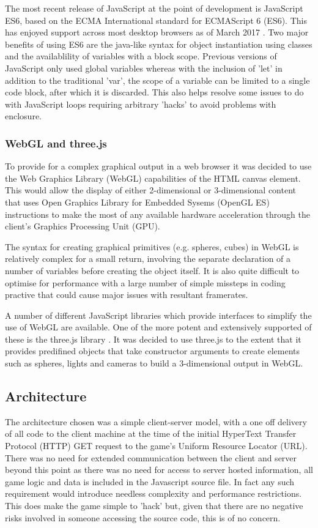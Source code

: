 \documentclass[twoside]{bhamthesis}
\begin{document}
The most recent release of JavaScript at the point of development is JavaScript ES6, based on the ECMA International standard for ECMAScript 6 (ES6). This has enjoyed support across most desktop browsers as of March 2017 \cite{zaytsev_ecmascript_2017}. Two major benefits of using ES6 are the java-like syntax for object instantiation using classes and the availablility of variables with a block scope. Previous versions of JavaScript only used global variables whereas with the inclusion of 'let' in addition to the traditional 'var', the scope of a variable can be limited to a single code block, after which it is discarded. This also helps resolve some issues to do with JavaScript loops requiring arbitrary 'hacks' to avoid problems with enclosure.


\subsubsection{WebGL and three.js}
To provide for a complex graphical output in a web browser it was decided to use the Web Graphics Library (WebGL) capabilities of the HTML canvas element. This would allow the display of either 2-dimensional or 3-dimensional content that uses Open Graphics Library for Embedded Sysems (OpenGL ES) instructions to make the most of any available hardware acceleration through the client's Graphics Processing Unit (GPU).

The syntax for creating graphical primitives (e.g. spheres, cubes) in WebGL is relatively complex for a small return, involving the separate declaration of a number of variables before creating the object itself. It is also quite difficult to optimise for performance with a large number of simple missteps in coding practive that could cause major issues with resultant framerates.

A number of different JavaScript libraries which provide interfaces to simplify the use of WebGL are available. One of the more potent and extensively supported of these is the three.js library \cite{cabello_three.js_????}. It was decided to use three.js to the extent that it provides predifined objects that take constructor arguments to create elements such as spheres, lights and cameras to build a 3-dimensional output in WebGL.

\subsection{Architecture}

The architecture chosen was a simple client-server model, with a one off delivery of all code to the client machine at the time of the initial HyperText Transfer Protocol (HTTP) GET request to the game's Uniform Resource Locator (URL). There was no need for extended communication between the client and server beyond this point as there was no need for access to server hosted information, all game logic and data is included in the Javascript source file. In fact any such requirement would introduce needless complexity and performance restrictions. This does make the game simple to 'hack' but, given that there are no negative risks involved in someone accessing the source code, this is of no concern.
\end{document}

